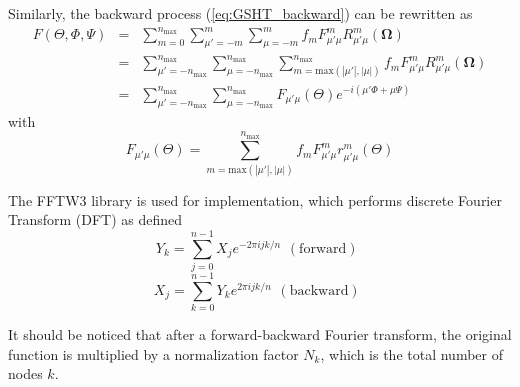 Similarly, the backward process (\ref{eq:GSHT_backward}) can be rewritten
as
\begin{eqnarray}
F(\Theta,\Phi,\Psi) & = & \sum_{m=0}^{n_{\mathrm{max}}}\sum_{\mu'=-m}^{m}\sum_{\mu=-m}^{m}f_{m}F_{\mu'\mu}^{m}R_{\mu'\mu}^{m}(\mathbf{\Omega})\nonumber \\
 & = & \sum_{\mu'=-n_{\mathrm{max}}}^{n_{\mathrm{max}}}\sum_{\mu=-n_{\mathrm{max}}}^{n_{\mathrm{max}}}\sum_{m=\mathrm{max}\left(\left|\mu'\right|,\left|\mu\right|\right)}^{n_{\mathrm{max}}}f_{m}F_{\mu'\mu}^{m}R_{\mu'\mu}^{m}(\mathbf{\Omega})\nonumber \\
 & = & \sum_{\mu'=-n_{\mathrm{max}}}^{n_{\mathrm{max}}}\sum_{\mu=-n_{\mathrm{max}}}^{n_{\mathrm{max}}}F_{\mu'\mu}(\Theta)e^{-i(\mu'\Phi+\mu\Psi)}\label{eq:f_mup_mu_2}
\end{eqnarray}
with
\begin{equation}
F_{\mu'\mu}(\Theta)=\sum_{m=\mathrm{max}\left(\left|\mu'\right|,\left|\mu\right|\right)}^{n_{\mathrm{max}}}f_{m}F_{\mu'\mu}^{m}r_{\mu'\mu}^{m}(\Theta)\label{eq:f_mup_mu_3}
\end{equation}


The FFTW3 library \citep{FFTW3} is used for implementation, which
performs discrete Fourier Transform (DFT) as defined
\begin{equation}
Y_{k}=\sum_{j=0}^{n-1}X_{j}e^{-2\pi ijk/n}\begin{array}{c}
\mathrm{(forward)}\end{array}\label{eq:fftw3-fwd}
\end{equation}
\begin{equation}
X_{j}=\sum_{k=0}^{n-1}Y_{k}e^{2\pi ijk/n}\begin{array}{c}
\mathrm{(backward)}\end{array}\label{eq:fftw3-bwd}
\end{equation}


It should be noticed that after a forward-backward Fourier transform,
the original function is multiplied by a normalization factor $N_{k}$,
which is the total number of nodes $k$.

